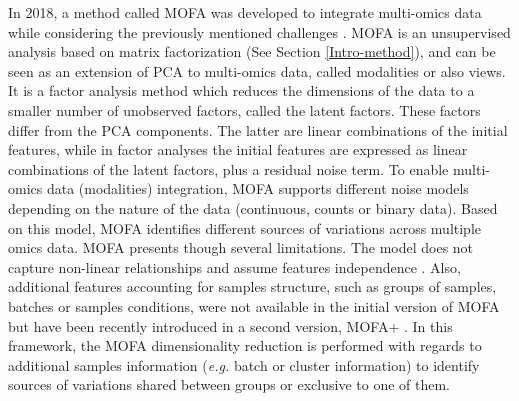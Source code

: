 In 2018, a method called \gls{MOFA} was developed to integrate multi-omics data while considering the previously mentioned challenges \cite{Argelaguet2018}. \gls{MOFA} is an unsupervised analysis based on matrix factorization (See Section \ref{Intro-method}), and can be seen as an extension of \gls{PCA} to multi-omics data, called modalities or also views. It is a factor analysis method which reduces the dimensions of the data to a smaller number of unobserved factors, called the latent factors. These factors differ from the \gls{PCA} components. The latter are linear combinations of the initial features, while in factor analyses the initial features are expressed as linear combinations of the latent factors, plus a residual noise term. To enable multi-omics data (modalities) integration, \gls{MOFA} supports different noise models depending on the nature of the data (continuous, counts or binary data). Based on this model, \gls{MOFA} identifies different sources of variations across multiple omics data. \gls{MOFA} presents though several limitations. The model does not capture non-linear relationships and assume features independence \cite{Argelaguet2018}. %
Also, additional features accounting for samples structure, such as groups of samples, batches or samples conditions, were not available in the initial version of \gls{MOFA} but have been recently introduced in a second version, \gls{MOFA}+ \cite{Argelaguet2020}. In this framework, the \gls{MOFA} dimensionality reduction is performed with regards to additional samples information (\textit{e.g.} batch or cluster information) to identify sources of variations shared between groups or exclusive to one of them.

